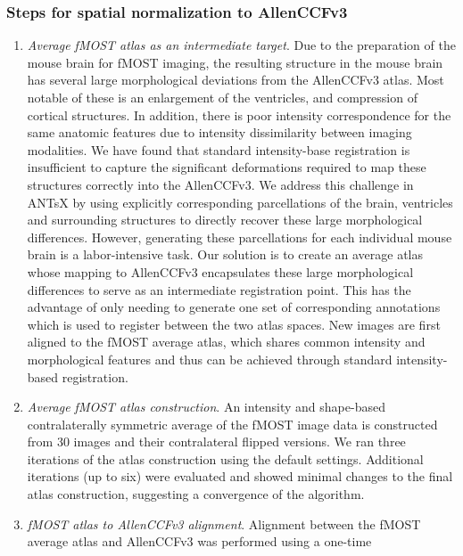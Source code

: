 \documentclass[
  12pt,
]{article}
\begin{document}
\subsubsection{Steps for spatial normalization to
AllenCCFv3}\label{steps-for-spatial-normalization-to-allenccfv3}

\begin{enumerate}
\def\labelenumi{\arabic{enumi}.}
\item
  \emph{Average fMOST atlas as an intermediate target}. Due to the
  preparation of the mouse brain for fMOST imaging, the resulting
  structure in the mouse brain has several large morphological
  deviations from the AllenCCFv3 atlas. Most notable of these is an
  enlargement of the ventricles, and compression of cortical structures.
  In addition, there is poor intensity correspondence for the same
  anatomic features due to intensity dissimilarity between imaging
  modalities. We have found that standard intensity-base registration is
  insufficient to capture the significant deformations required to map
  these structures correctly into the AllenCCFv3. We address this
  challenge in ANTsX by using explicitly corresponding parcellations of
  the brain, ventricles and surrounding structures to directly recover
  these large morphological differences. However, generating these
  parcellations for each individual mouse brain is a labor-intensive
  task. Our solution is to create an average atlas whose mapping to
  AllenCCFv3 encapsulates these large morphological differences to serve
  as an intermediate registration point. This has the advantage of only
  needing to generate one set of corresponding annotations which is used
  to register between the two atlas spaces. New images are first aligned
  to the fMOST average atlas, which shares common intensity and
  morphological features and thus can be achieved through standard
  intensity-based registration.
\item
  \emph{Average fMOST atlas construction}. An intensity and shape-based
  contralaterally symmetric average of the fMOST image data is
  constructed from 30 images and their contralateral flipped versions.
  We ran three iterations of the atlas construction using the default
  settings. Additional iterations (up to six) were evaluated and showed
  minimal changes to the final atlas construction, suggesting a
  convergence of the algorithm.
\item
  \emph{fMOST atlas to AllenCCFv3 alignment}. Alignment between the
  fMOST average atlas and AllenCCFv3 was performed using a one-time

\end{enumerate}
\end{document}
